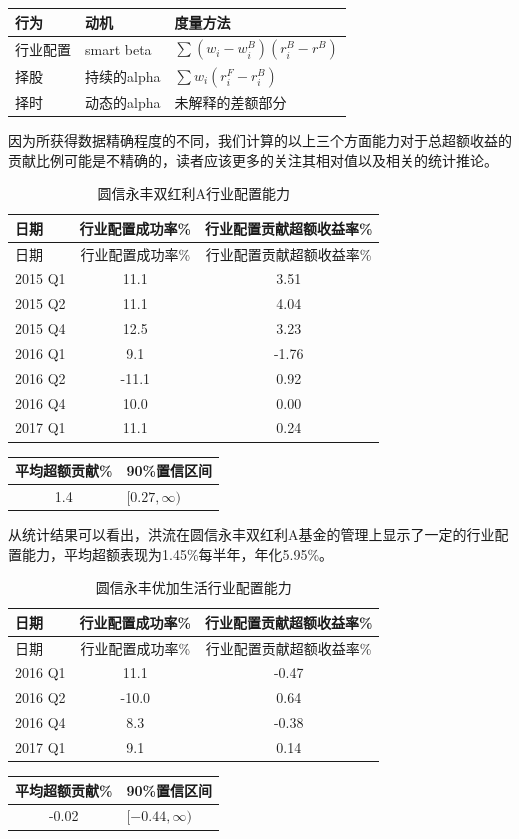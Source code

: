 \documentclass[hyperref,]{ctexart}
\begin{document}
\begin{longtable}[]{@{}lll@{}}
\toprule
行为 & 动机 & 度量方法\tabularnewline
\midrule
\endhead
行业配置 & smart beta & \(\sum(w_i-w_i^B)(r_i^B-r^B)\)\tabularnewline
择股 & 持续的alpha & \(\sum w_{i}(r_{i}^F-r_{i}^B)\)\tabularnewline
择时 & 动态的alpha & 未解释的差额部分\tabularnewline
\bottomrule
\end{longtable}

因为所获得数据精确程度的不同，我们计算的以上三个方面能力对于总超额收益的贡献比例可能是不精确的，读者应该更多的关注其相对值以及相关的统计推论。

\begin{longtable}[]{@{}lcc@{}}
\caption{圆信永丰双红利A行业配置能力}\tabularnewline
\toprule
日期 & 行业配置成功率\% & 行业配置贡献超额收益率\%\tabularnewline
\midrule
\endfirsthead
\toprule
日期 & 行业配置成功率\% & 行业配置贡献超额收益率\%\tabularnewline
\midrule
\endhead
2015 Q1 & 11.1 & 3.51\tabularnewline
2015 Q2 & 11.1 & 4.04\tabularnewline
2015 Q4 & 12.5 & 3.23\tabularnewline
2016 Q1 & 9.1 & -1.76\tabularnewline
2016 Q2 & -11.1 & 0.92\tabularnewline
2016 Q4 & 10.0 & 0.00\tabularnewline
2017 Q1 & 11.1 & 0.24\tabularnewline
\bottomrule
\end{longtable}

\begin{longtable}[]{@{}cl@{}}
\toprule
平均超额贡献\% & 90\%置信区间\tabularnewline
\midrule
\endhead
1.4 & \([0.27,\infty)\)\tabularnewline
\bottomrule
\end{longtable}

从统计结果可以看出，洪流在圆信永丰双红利A基金的管理上显示了一定的行业配置能力，平均超额表现为1.45\%每半年，年化5.95\%。

\begin{longtable}[]{@{}lcc@{}}
\caption{圆信永丰优加生活行业配置能力}\tabularnewline
\toprule
日期 & 行业配置成功率\% & 行业配置贡献超额收益率\%\tabularnewline
\midrule
\endfirsthead
\toprule
日期 & 行业配置成功率\% & 行业配置贡献超额收益率\%\tabularnewline
\midrule
\endhead
2016 Q1 & 11.1 & -0.47\tabularnewline
2016 Q2 & -10.0 & 0.64\tabularnewline
2016 Q4 & 8.3 & -0.38\tabularnewline
2017 Q1 & 9.1 & 0.14\tabularnewline
\bottomrule
\end{longtable}

\begin{longtable}[]{@{}cl@{}}
\toprule
平均超额贡献\% & 90\%置信区间\tabularnewline
\midrule
\endhead
-0.02 & \([-0.44,\infty)\)\tabularnewline
\bottomrule
\end{longtable}
\end{document}
